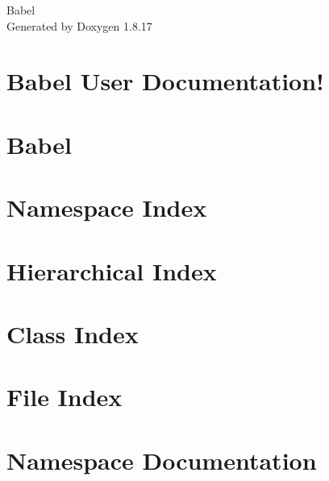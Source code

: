 \let\mypdfximage\pdfximage\def\pdfximage{\immediate\mypdfximage}\documentclass[twoside]{book}
\newcommand{\+}{\discretionary{\mbox{\scriptsize$\hookleftarrow$}}{}{}}
\newcommand{\clearemptydoublepage}{%
  \newpage{\pagestyle{empty}\cleardoublepage}%
}
\begin{document}
\hypersetup{pageanchor=false,
             bookmarksnumbered=true,
             pdfencoding=unicode
            }
\begin{titlepage}
\vspace*{7cm}
\begin{center}%
{\Large Babel }\\
\vspace*{1cm}
{\large Generated by Doxygen 1.8.17}\\
\end{center}
\end{titlepage}
\clearemptydoublepage
{}
\tableofcontents
\clearemptydoublepage
{}
\hypersetup{pageanchor=true}

\chapter{Babel User Documentation!}
\label{md_Documentation_UserDocumentation}

\chapter{Babel}
\label{md_README}

\chapter{Namespace Index}

\chapter{Hierarchical Index}

\chapter{Class Index}

\chapter{File Index}

\chapter{Namespace Documentation}




\end{document}
